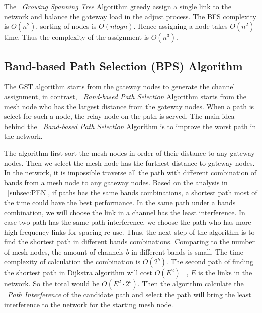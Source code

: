 The ~\emph{Growing Spanning Tree} Algorithm greedy assign a single link to the network and balance the gateway load in the adjust process. The BFS complexity is $O(n^2)$, sorting of nodes is $O(nlogn)$. Hence assigning a node takes $O(n^2)$ time. Thus the complexity of the assignment is $O(n^3)$.









\subsection{Band-based Path Selection (BPS) Algorithm}
\label{subsec:step}

The GST algorithm starts from the gateway nodes to generate the channel assignment, in contrast, ~\emph{Band-based Path Selection} Algorithm starts from the mesh node who has the largest distance from the gateway nodes.
When a path is select for such a node, the relay node on the path is served. 
The main idea behind the ~\emph{Band-based Path Selection} Algorithm is to improve the worst path in the network. 

The algorithm first sort the mesh nodes in order of their distance to any gateway nodes. Then we select the mesh node has the furthest distance to gateway nodes. In the network, it is impossible traverse all the path with different combination of bands from a mesh node to any gateway nodes. Based on the analysis in ~\ref{subsec:PEN}, if paths has the same bands combinations, a shortest path most of the time could have the best performance.
In the same path under a bands combination, we will choose the link in a channel has the least interference.
 In case two path has the same path interference, we choose the path who has more high frequency links for spacing re-use.
Thus, the next step of the algorithm is to find the shortest path in different bands combinations. Comparing to the number of mesh nodes, the amount of channels $b$ in different bands is small. The time complexity of calculation the combination is $O(2^b)$. 
The second path of finding the shortest path in Dijkstra algorithm will cost $O(E^2)$ ~\cite{golden1976shortest}, $E$ is the links in the network. So the total would be $O(E^2\cdot 2^b)$.
Then the algorithm calculate the ~\emph{Path Interference} of the candidate path and select the path will bring the least interference to the network for the starting mesh node.

